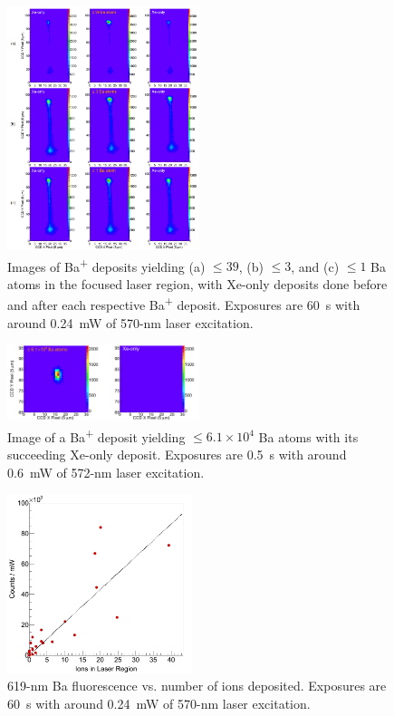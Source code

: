 \documentclass[aps,pra,reprint,superscriptaddress]{revtex4-1}
\begin{document}
\begin{figure}
\includegraphics[width=0.5\textwidth]{figures/xebaxe_instantaneous_scrunched.png}
\caption{Images of Ba\textsuperscript{+} deposits yielding (a) $\leq 39$, (b) $\leq 3$, and (c) $\leq 1$ Ba atoms in the focused laser region, with Xe-only deposits done before and after each respective Ba\textsuperscript{+} deposit.  Exposures are 60~s with around 0.24~mW of 570-nm laser excitation.}
\label{fig:XeBaXe}
\end{figure}

\begin{figure}
\includegraphics[width=0.5\textwidth]{figures/xebaxe_largest_instantaneous.png}
\caption{Image of a Ba\textsuperscript{+} deposit yielding $\leq 6.1 \times 10^4$ Ba atoms with its succeeding Xe-only deposit.  Exposures are 0.5~s with around 0.6~mW of 572-nm laser excitation.}
\label{fig:XeBaXeLarge}
\end{figure}

\begin{figure}
\includegraphics[width=0.48\textwidth]{figures/lin_just20150807_lin.png}
\caption{619-nm Ba fluorescence vs. number of ions deposited.  Exposures are 60~s with around 0.24~mW of 570-nm laser excitation.}
\label{fig:ctsVsIons}
\end{figure}
\end{document}
